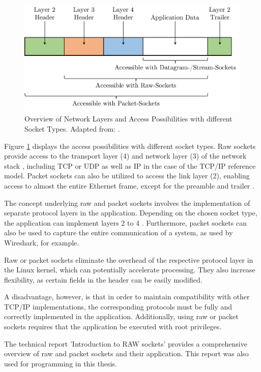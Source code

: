 \begin{figure}[h]
    \centering
    \includegraphics[width=0.9\linewidth]{figures/linux_nwstack/image02.pdf}
    \caption[Overview of Network Layers and Access Possibilities with different Socket Types]{Overview of Network Layers and Access Possibilities with different Socket Types. Adapted from: \cite{sock07}.}
    \label{fig:SocketAccessPossib}
\end{figure}

Figure \ref{fig:SocketAccessPossib} displays the access possibilities with different socket types. Raw sockets provide access to the transport layer (4) and network layer (3) of the network stack \cite{sock08}, including TCP or UDP as well as IP in the case of the TCP/IP reference model. Packet sockets can also be utilized to access the link layer (2), enabling access to almost the entire Ethernet frame, except for the preamble and trailer \cite{sock09}.

The concept underlying raw and packet sockets involves the implementation of separate protocol layers in the application. Depending on the chosen socket type, the application can implement layers 2 to 4 \cite{sock08}. Furthermore, packet sockets can also be used to capture the entire communication of a system, as used by Wireshark, for example.

Raw or packet sockets eliminate the overhead of the respective protocol layer in the Linux kernel, which can potentially accelerate processing. They also increase flexibility, as certain fields in the header can be easily modified.

A disadvantage, however, is that in order to maintain compatibility with other TCP/IP implementations, the corresponding protocols must be fully and correctly implemented in the application. Additionally, using raw or packet sockets requires that the application be executed with root privileges.

The technical report 'Introduction to RAW sockets' \cite{sock07} provides a comprehensive overview of raw and packet sockets and their application. This report was also used for programming in this thesis.



